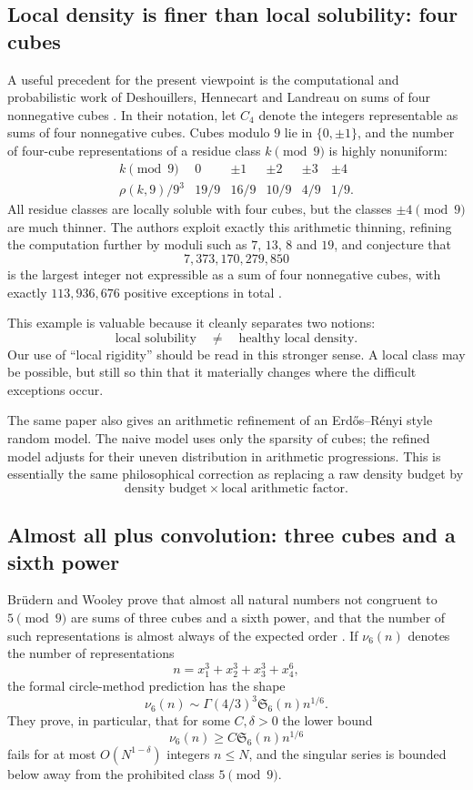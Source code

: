 \documentclass[../Axiomathic.tex]{subfiles}
\begin{document}
\subsection{Local density is finer than local solubility: four cubes}

A useful precedent for the present viewpoint is the computational and probabilistic work of Deshouillers, Hennecart and Landreau on sums of four nonnegative cubes \cite{Deshouillers1999}.  In their notation, let $C_4$ denote the integers representable as sums of four nonnegative cubes.  Cubes modulo $9$ lie in $\{0,\pm1\}$, and the number of four-cube representations of a residue class $k\pmod 9$ is highly nonuniform:
\[
\begin{array}{c|ccccc}
 k\pmod 9&0&\pm1&\pm2&\pm3&\pm4\\
\hline
 \rho(k,9)/9^3&19/9&16/9&10/9&4/9&1/9.
\end{array}
\]
All residue classes are locally soluble with four cubes, but the classes $\pm4\pmod 9$ are much thinner.  The authors exploit exactly this arithmetic thinning, refining the computation further by moduli such as $7$, $13$, $8$ and $19$, and conjecture that
\[
  7,373,170,279,850
\]
is the largest integer not expressible as a sum of four nonnegative cubes, with exactly $113,936,676$ positive exceptions in total \cite{Deshouillers1999}.

This example is valuable because it cleanly separates two notions:
\[
  \text{local solubility}\quad\ne\quad\text{healthy local density}.
\]
Our use of ``local rigidity'' should be read in this stronger sense.  A local class may be possible, but still so thin that it materially changes where the difficult exceptions occur.

The same paper also gives an arithmetic refinement of an Erd\H{o}s--R\'enyi style random model.  The naive model uses only the sparsity of cubes; the refined model adjusts for their uneven distribution in arithmetic progressions.  This is essentially the same philosophical correction as replacing a raw density budget by
\[
  \text{density budget}\times\text{local arithmetic factor}.
\]

\subsection{Almost all plus convolution: three cubes and a sixth power}

Br\"udern and Wooley prove that almost all natural numbers not congruent to $5\pmod 9$ are sums of three cubes and a sixth power, and that the number of such representations is almost always of the expected order \cite{BruedernWooley2001}.  If $\nu_6(n)$ denotes the number of representations
\[
  n=x_1^3+x_2^3+x_3^3+x_4^6,
\]
the formal circle-method prediction has the shape
\[
  \nu_6(n)\sim \Gamma(4/3)^3\mathfrak S_6(n)n^{1/6}.
\]
They prove, in particular, that for some $C,\delta>0$ the lower bound
\[
  \nu_6(n)\ge C\mathfrak S_6(n)n^{1/6}
\]
fails for at most $O(N^{1-\delta})$ integers $n\le N$, and the singular series is bounded below away from the prohibited class $5\pmod 9$.
\end{document}
